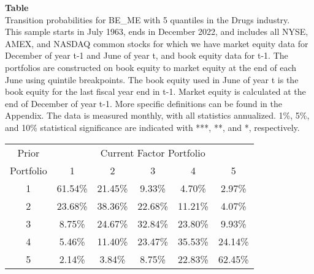 \begin{table*}[ht!]
\raggedright
{}
\label{tab: transition_probs_BE_ME_Drugs_with_5_quantiles}
\textbf{Table \thetable} \\
Transition probabilities for BE_ME with 5 quantiles in the Drugs industry. \\
\hspace*{1em}This sample starts in July 1963, ends in December 2022, and includes all NYSE, AMEX, and NASDAQ common stocks for which we have market equity data for December of year t-1 and June of year t, and book equity data for t-1. The portfolios are constructed on book equity to market equity at the end of each June using quintile breakpoints.  The book equity used in June of year t is the book equity for the last fiscal year end in t-1.  Market equity is calculated at the end of December of year t-1.  More specific definitions can be found in the Appendix.  The data is measured monthly, with all statistics annualized.  1\%, 5\%, and 10\% statistical significance are indicated with ***, **, and *, respectively. \\
\vspace{0.5em}
\centering
\begin{adjustbox}{max width=\textwidth}
\begin{tabular}{@{}cccccc@{}}
\toprule
Prior & \multicolumn{5}{c}{Current Factor Portfolio} \\
Portfolio & 1 & 2 & 3 & 4 & 5 \\
\midrule
1 & 61.54\% & 21.45\% & 9.33\% & 4.70\% & 2.97\% \\
2 & 23.68\% & 38.36\% & 22.68\% & 11.21\% & 4.07\% \\
3 & 8.75\% & 24.67\% & 32.84\% & 23.80\% & 9.93\% \\
4 & 5.46\% & 11.40\% & 23.47\% & 35.53\% & 24.14\% \\
5 & 2.14\% & 3.84\% & 8.75\% & 22.83\% & 62.45\% \\
\bottomrule
\end{tabular}
\end{adjustbox}
\end{table*}
